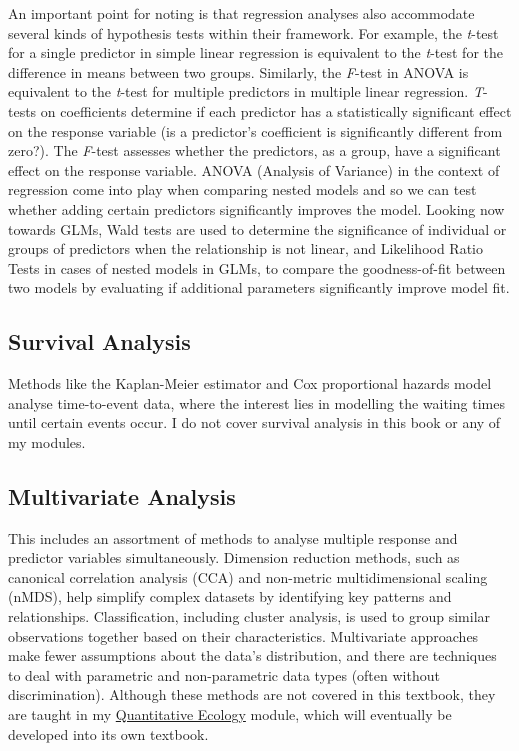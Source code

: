 \documentclass[
  letterpaper,
]{book}
\begin{document}
An important point for noting is that regression analyses also
accommodate several kinds of hypothesis tests within their framework.
For example, the \emph{t}-test for a single predictor in simple linear
regression is equivalent to the \emph{t}-test for the difference in
means between two groups. Similarly, the \emph{F}-test in ANOVA is
equivalent to the \emph{t}-test for multiple predictors in multiple
linear regression. \emph{T}-tests on coefficients determine if each
predictor has a statistically significant effect on the response
variable (is a predictor's coefficient is significantly different from
zero?). The \emph{F}-test assesses whether the predictors, as a group,
have a significant effect on the response variable. ANOVA (Analysis of
Variance) in the context of regression come into play when comparing
nested models and so we can test whether adding certain predictors
significantly improves the model. Looking now towards GLMs, Wald tests
are used to determine the significance of individual or groups of
predictors when the relationship is not linear, and Likelihood Ratio
Tests in cases of nested models in GLMs, to compare the goodness-of-fit
between two models by evaluating if additional parameters significantly
improve model fit.

\subsection{Survival Analysis}\label{survival-analysis}

Methods like the Kaplan-Meier estimator and Cox proportional hazards
model analyse time-to-event data, where the interest lies in modelling
the waiting times until certain events occur. I do not cover survival
analysis in this book or any of my modules.

\subsection{Multivariate Analysis}\label{multivariate-analysis}

This includes an assortment of methods to analyse multiple response and
predictor variables simultaneously. Dimension reduction methods, such as
canonical correlation analysis (CCA) and non-metric multidimensional
scaling (nMDS), help simplify complex datasets by identifying key
patterns and relationships. Classification, including cluster analysis,
is used to group similar observations together based on their
characteristics. Multivariate approaches make fewer assumptions about
the data's distribution, and there are techniques to deal with
parametric and non-parametric data types (often without discrimination).
Although these methods are not covered in this textbook, they are taught
in my
\href{https://tangledbank.netlify.app/BCB743/BCB743_index.html}{Quantitative
Ecology} module, which will eventually be developed into its own
textbook.
\end{document}
